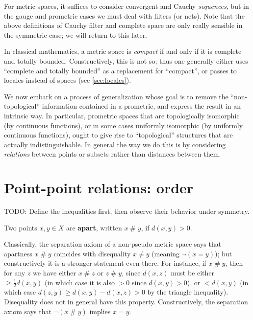 \documentclass{article}
\def\apart{\mathrel{\#}}
\begin{document}
For metric spaces, it suffices to consider convergent and Cauchy \emph{sequences}, but in the gauge and prometric cases we must deal with filters (or nets).
Note that the above definitions of Cauchy filter and complete space are only really sensible in the symmetric case; we will return to this later.

In classical mathematics, a metric space is \emph{compact} if and only if it is complete and totally bounded.
Constructively, this is not so; thus one generally either uses ``complete and totally bounded'' as a replacement for ``compact'', or passes to locales instead of spaces (see \cref{sec:locales}).


We now embark on a process of generalization whose goal is to remove the ``non-topological'' information contained in a prometric, and express the result in an intrinsic way.
In particular, prometric spaces that are topologically isomorphic (by continuous functions), or in some cases uniformly isomorphic (by uniformly continuous functions), ought to give rise to ``topological'' structures that are actually indistinguishable.
In general the way we do this is by considering \emph{relations} between points or subsets rather than distances between them.


\section{Point-point relations: order}
\label{sec:point-point}

TODO: Define the inequalities first, then observe their behavior under symmetry.



\begin{defn}
  Two points $x,y\in X$ are \textbf{apart}, written $x\apart y$, if $d(x,y)>0$.
\end{defn}

Classically, the separation axiom of a non-pseudo metric space says that apartness $x\apart y$ coincides with disequality $x\neq y$ (meaning $\neg(x=y)$); but constructively it is a stronger statement even there.
For instance, if $x\apart y$, then for any $z$ we have either $x\apart z$ or $z\apart y$, since $d(x,z)$ must be either $\ge \frac12 d(x,y)$ (in which case it is also $>0$ since $d(x,y)>0$). or $< d(x,y)$ (in which case $d(z,y) \ge d(x,y) - d(x,z) > 0$ by the triangle inequality).
Disequality does not in general have this property.
Constructively, the separation axiom says that $\neg(x\apart y)$ implies $x=y$.
\end{document}
